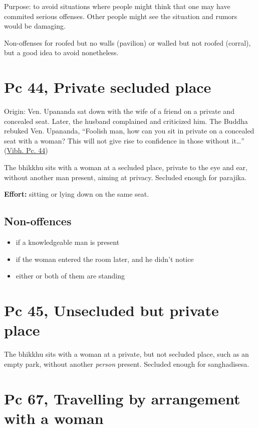 Purpose: to avoid situations where people might think that one may have
commited serious offenses. Other people might see the situation and
rumors would be damaging.

Non-offenses for roofed but no walls (pavilion) or walled but not roofed
(corral), but a good idea to avoid nonetheless.

\section{Pc 44, Private secluded place}

Origin: Ven. Upananda sat down with the wife of a friend on a private
and concealed seat. Later, the husband complained and criticized him.
The Buddha rebuked Ven. Upananda, ``Foolish man, how can you sit in
private on a concealed seat with a woman? This will not give rise to
confidence in those without it\ldots{}''
(\href{https://suttacentral.net/pli-tv-bu-vb-pc44/en/brahmali}{Vibh. Pc.
44})

The bhikkhu sits with a woman at a secluded place, private to the eye
and ear, without another man present, aiming at privacy. Secluded enough
for parajika.

\textbf{Effort:} sitting or lying down on the same seat.

\subsection{Non-offences}

\vspace*{-0.5\baselineskip}
\enlargethispage{\baselineskip}

\begin{itemize}
\tightlist
\item
  if a knowledgeable man is present
\item
  if the woman entered the room later, and he didn't notice
\item
  either or both of them are standing
\end{itemize}

\section{Pc 45, Unsecluded but private place}

The bhikkhu sits with a woman at a private, but not secluded place, such
as an empty park, without another \emph{person} present. Secluded enough
for sanghadisesa.

\section{Pc 67, Travelling by arrangement with a woman}

